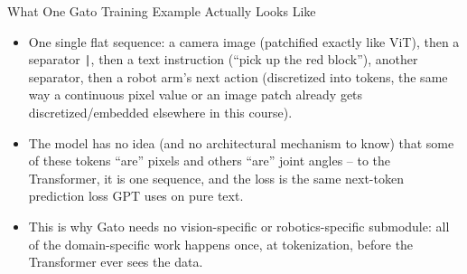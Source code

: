 \begin{vbframe}{What One Gato Training Example Actually Looks Like}
\begin{center}
\end{center}
\begin{itemize}
  \item One single flat sequence: a camera image (patchified exactly like ViT), then a separator {\tt |}, then a text instruction (``pick up the red block''), another separator, then a robot arm's next action (discretized into tokens, the same way a continuous pixel value or an image patch already gets discretized/embedded elsewhere in this course).
  \item The model has no idea (and no architectural mechanism to know) that some of these tokens ``are” pixels and others ``are” joint angles -- to the Transformer, it is one sequence, and the loss is the same next-token prediction loss GPT uses on pure text.
  \item This is why Gato needs no vision-specific or robotics-specific submodule: all of the domain-specific work happens once, at tokenization, before the Transformer ever sees the data.
\end{itemize}
\end{vbframe}

